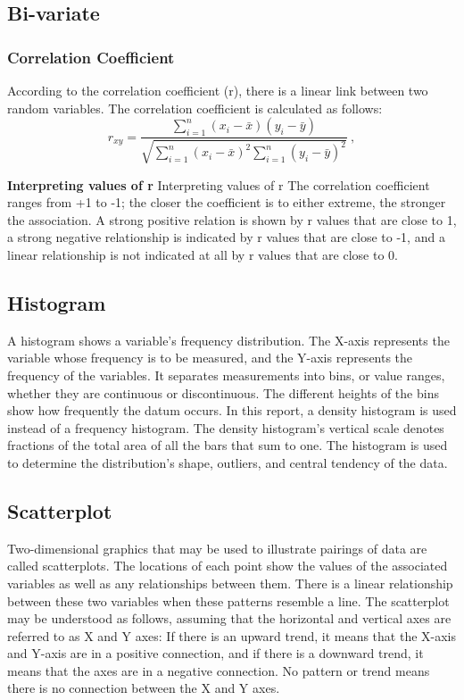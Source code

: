 \documentclass[12 pt]{scrartcl}
\begin{document}
\subsection{Bi-variate}
\subsubsection{Correlation Coefficient}
According to the correlation coefficient (r), there is a linear link between two random variables.
The correlation coefficient is calculated as follows:
\[
	r_{xy} = \frac {\sum_{i=1}^{n}(x_i - \bar{x})(y_i - \bar{y})}{\sqrt{\sum_{i=1}^{n}(x_i - \bar{x})^2\sum_{i=1}^{n}(y_i - \bar{y})^2}}\:,
\]
\citep{R}

\textbf{Interpreting values of r} Interpreting values of r The correlation coefficient ranges from +1 to -1; the closer the coefficient is to either extreme, the stronger the association. A strong positive relation is shown by r values that are close to 1, a strong negative relationship is indicated by r values that are close to -1, and a linear relationship is not indicated at all by r values that are close to 0. 

\subsection{Histogram}
A histogram shows a variable's frequency distribution. The X-axis represents the variable whose frequency is to be measured, and the Y-axis represents the frequency of the variables. It separates measurements into bins, or value ranges, whether they are continuous or discontinuous. The different heights of the bins show how frequently the datum occurs. In this report, a density histogram is used instead of a frequency histogram. The density histogram's vertical scale denotes fractions of the total area of all the bars that sum to one. The histogram is used to determine the distribution's shape, outliers, and central tendency of the data.\citep{R}

\subsection{Scatterplot}
Two-dimensional graphics that may be used to illustrate pairings of data are called scatterplots. The locations of each point show the values of the associated variables as well as any relationships between them. There is a linear relationship between these two variables when these patterns resemble a line. The scatterplot may be understood as follows, assuming that the horizontal and vertical axes are referred to as X and Y axes: If there is an upward trend, it means that the X-axis and Y-axis are in a positive connection, and if there is a downward trend, it means that the axes are in a negative connection. No pattern or trend means there is no connection between the X and Y axes.\citep{R}
\end{document}
